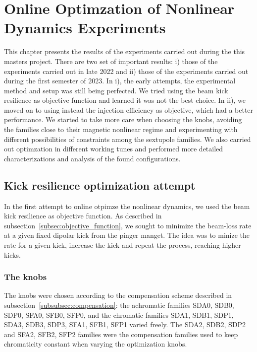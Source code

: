 \chapter{Online Optimzation of Nonlinear Dynamics Experiments}
This chapter presents the results of the experiments carried out during the this masters project. There are two set of important results: i) those of the experiments carried out in late 2022 and ii) those of the experiments carried out during the first semester of 2023. In i), the early attempts, the experimental method and setup was still being perfected. We tried using the beam kick resilience as objective function and learned it was not the best choice. In ii), we moved on to using instead the injection efficiency as objective, which had a better performance.  We started to take more care when choosing the knobs, avoiding the families close to their magnetic nonlinear regime and experimenting with different possibilities of constraints among the sextupole families. We also carried out optimzation in different working tunes and performed more detailed characterizations and analysis of the found configurations.
\section{Kick resilience optimization attempt}
In the first attempt to online otpimze the nonlinear dynamics, we used the beam kick resilience as objective function. As described in subsection~\ref{subsec:objective_function}, we sought to minimize the beam-loss rate at a given fixed dipolar kick from the pinger manget. The idea was to minize the rate for a given kick, increase the kick and repeat the process, reaching higher kicks.
\subsection{The knobs}
The knobs were chosen according to the compensation scheme described in subsection~\ref{subsubsec:compensation}: the achromatic families SDA0, SDB0, SDP0, SFA0, SFB0, SFP0, and the chromatic families SDA1, SDB1, SDP1, SDA3, SDB3, SDP3, SFA1, SFB1, SFP1 varied freely. The SDA2, SDB2, SDP2 and SFA2, SFB2, SFP2 families were the compensation families used to keep chromaticity constant when varying the optimization knobs.
